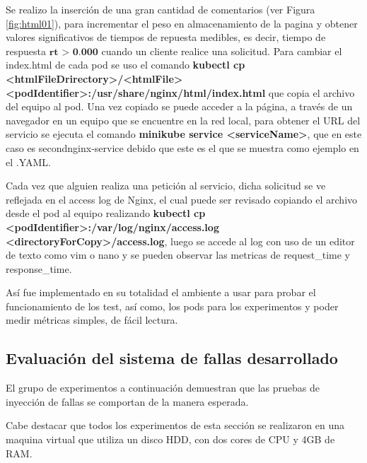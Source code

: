 \par Se realizo la inserción de una gran cantidad de comentarios (ver Figura \ref{fig:html01}), para incrementar el peso en almacenamiento de la pagina y obtener valores significativos de tiempos de repuesta medibles, es decir, tiempo de respuesta $\textbf{rt > 0.000}$ cuando un cliente realice una solicitud. Para cambiar el index.html de cada pod se uso el comando \textbf{kubectl cp <htmlFileDrirectory>/<htmlFile> <podIdentifier>:/usr/share/nginx/html/index.html} que copia el archivo del equipo al pod. Una vez copiado se puede acceder a la p\'agina, a través de un navegador en un equipo que se encuentre en la red local, para obtener el URL del servicio se ejecuta el comando \textbf{minikube service <serviceName>}, que en este caso es secondnginx-service debido que este es el que se muestra como ejemplo en el .YAML.\\

\par Cada vez que alguien realiza una petición al servicio, dicha solicitud se ve reflejada en el access log de Nginx, el cual puede ser revisado copiando el archivo desde el pod al equipo realizando \textbf{kubectl cp <podIdentifier>:/var/log/nginx/access.log <directoryForCopy>/access.log}, luego se accede al log con uso de un editor de texto como vim o nano y se pueden observar las metricas de request\_time y response\_time.\\ 

\label{sec:servicio_web}
\par Así fue implementado en su totalidad el ambiente a usar para probar el funcionamiento de los test, así como, los pods para los experimentos y poder medir métricas simples, de fácil lectura. 

\subsection{Evaluaci\'on del sistema de fallas desarrollado}

\par El grupo de experimentos a continuación demuestran que las pruebas de inyección de fallas se comportan de la manera esperada.\\ 

\par Cabe destacar que todos los experimentos de esta sección se realizaron en una maquina virtual que utiliza un disco HDD, con dos cores de CPU y 4GB de RAM.\\

